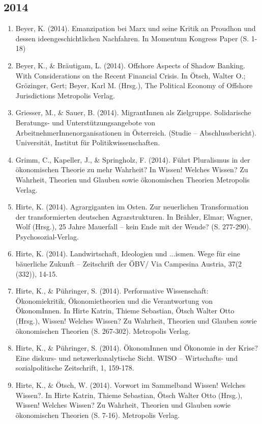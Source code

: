 \subsection*{2014}
\begin{enumerate}
	 \item Beyer, K. (2014). Emanzipation bei Marx und seine Kritik an Proudhon und dessen ideengeschichtlichen Nachfahren. In Momentum Kongress Paper (S. 1-18)
	 \item Beyer, K., \& Bräutigam, L. (2014). Offshore Aspects of Shadow Banking. With Considerations on the Recent Financial Crisis. In Ötsch, Walter O.; Grözinger, Gert; Beyer, Karl M. (Hrsg.), The Political Economy of Offshore Jurisdictions Metropolis Verlag.
	 \item Griesser, M., \& Sauer, B. (2014). MigrantInnen als Zielgruppe. Solidarische Beratungs- und Unterstützungsangebote von ArbeitnehmerInnenorganisationen in Österreich. (Studie -- Abschlussbericht). Universität, Institut für Politikwissenschaften.
	 \item Grimm, C., Kapeller, J., \& Springholz, F. (2014). Führt Pluralismus in der ökonomischen Theorie zu mehr Wahrheit? In Wissen! Welches Wissen? Zu Wahrheit, Theorien und Glauben sowie ökonomischen Theorien Metropolis Verlag.
	 \item Hirte, K. (2014). Agrargiganten im Osten. Zur neuerlichen Transformation der transformierten deutschen Agrarstrukturen. In Brähler, Elmar; Wagner, Wolf (Hrsg.), 25 Jahre Mauerfall – kein Ende mit der Wende? (S. 277-­290). Psychosozial-Verlag.
	 \item Hirte, K. (2014). Landwirtschaft, Ideologien und \glqq ...ismen\grqq{}. Wege für eine bäuerliche Zukunft – Zeitschrift der ÖBV/ Via Campesina Austria, 37(2 (332)), 14-15.
	 \item Hirte, K., \& Pühringer, S. (2014). Performative Wissenschaft: Ökonomiekritik, Ökonomietheorien und die Verantwortung von ÖkonomInnen. In Hirte Katrin, Thieme Sebastian, Ötsch Walter Otto (Hrsg.), Wissen! Welches Wissen? Zu Wahrheit, Theorien und Glauben sowie ökonomischen Theorien (S. 267-302). Metropolis Verlag.
	 \item Hirte, K., \& Pühringer, S. (2014). ÖkonomInnen und Ökonomie in der Krise? Eine diskurs- und netzwerkanalytische Sicht. WISO -- Wirtschafts- und sozialpolitische Zeitschrift, 1, 159-178.
	 \item Hirte, K., \& Ötsch, W. (2014). Vorwort im Sammelband \glqq Wissen! Welches Wissen?\grqq{}. In Hirte Katrin, Thieme Sebastian, Ötsch Walter Otto (Hrsg.), Wissen! Welches Wissen? Zu Wahrheit, Theorien und Glauben sowie ökonomischen Theorien (S. 7-16). Metropolis Verlag.

\end{enumerate}
